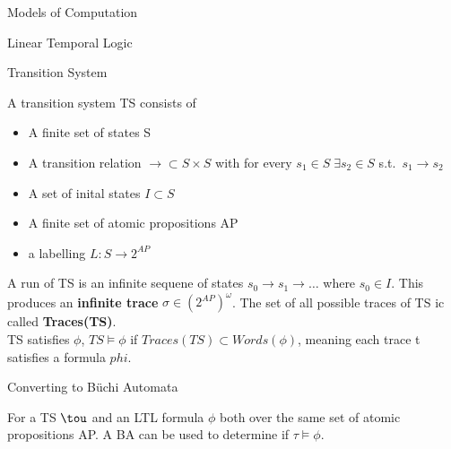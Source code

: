 \documentclass[12pt, letterpaper]{article}
\begin{document}
\begin{section}{Models of Computation}
\begin{subsection}{Linear Temporal Logic}
    \begin{subsubsection}{Transition System}

      A transition system TS consists of
      \begin{itemize}
        \item A finite set of states S
        \item A transition relation \(\to \subset S \times S\) with for every
        \(s_{1} \in S \; \exists s_{2} \in S\) s.t.\ \(s_{1} \to s_{2}\)
        \item A set of inital states \(I \subset S\)
        \item A finite set of atomic propositions AP
        \item a labelling \(L: S \to 2^{AP}\)
      \end{itemize}

      A run of TS is an infinite sequene of states \(s_{0} \to s_{1} \to \dots\)
      where \(s_{0} \in I\). This produces an \textbf{infinite trace}
      \(\sigma \in (2^{AP})^{\omega}\). The set of all possible traces of TS ic
      called \textbf{Traces(TS)}. \\
      TS satisfies \(\phi\), \(TS \models \phi\) if
      \(Traces(TS) \subset Words(\phi)\), meaning each trace t satisfies a
      formula \(phi\).

    \end{subsubsection}

    \begin{subsubsection}{Converting to B\"uchi Automata}

      For a TS \(\tou\) and an LTL formula \(\phi\) both over the same set of
      atomic propositions AP. A BA can be used to determine if
      \(\tau \models \phi\).

    \end{subsubsection}

  \end{subsection}

\end{section}
\end{document}
